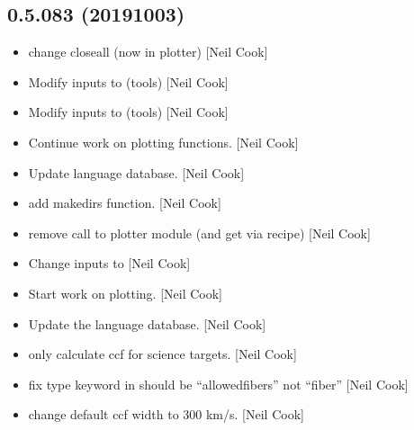 \documentclass[a4paper,10pt,english]{report}
\begin{document}
\subsection{0.5.083 (2019\sphinxhyphen{}10\sphinxhyphen{}03)}
\label{\detokenize{misc/changelog:id78}}\begin{itemize}
\item {} 
 \sphinxhyphen{} change closeall (now in
plotter) {[}Neil Cook{]}

\item {} 
Modify inputs to  (tools) {[}Neil Cook{]}

\item {} 
Modify inputs to  (tools) {[}Neil Cook{]}

\item {} 
Continue work on plotting functions. {[}Neil Cook{]}

\item {} 
Update language database. {[}Neil Cook{]}

\item {} 
 \sphinxhyphen{} add makedirs function. {[}Neil Cook{]}

\item {} 
 \sphinxhyphen{} remove call to plotter module (and get via
recipe) {[}Neil Cook{]}

\item {} 
Change inputs to  {[}Neil Cook{]}

\item {} 
Start work on plotting. {[}Neil Cook{]}

\item {} 
Update the language database. {[}Neil Cook{]}

\item {} 
 \sphinxhyphen{} only calculate ccf for science targets.
{[}Neil Cook{]}

\item {} 
 \sphinxhyphen{} fix type keyword in 
should be “allowedfibers” not “fiber” {[}Neil Cook{]}

\item {} 
 \sphinxhyphen{} change default ccf
width to 300 km/s. {[}Neil Cook{]}


\end{itemize}
\end{document}
